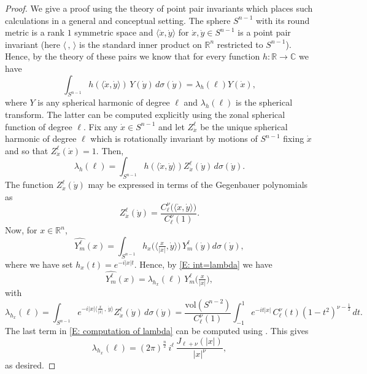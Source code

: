 \documentclass[11pt,reqno]{amsart}
\newcommand{\R}{{\mathbb R}}
\newcommand{\C}{{\mathbb C}}
\theoremstyle{definition}
\begin{document}
\begin{proof}
We give a proof using the theory of point pair invariants \cite{Sel} which places such calculations in a general and conceptual setting. The sphere $S^{n-1}$ with its round metric is a rank $1$ symmetric space and $\langle \dot x, \dot y \rangle$ for $\dot x, \dot y \in S^{n-1}$ is a point pair invariant (here $\langle \, , \, \rangle$ is the standard inner product on $\R^n$ restricted to $S^{n-1}$). Hence, by the theory of these pairs we know that for every function $h:\R \to \C$ we have
\begin{equation}\label{E: int=lambda}
\int_{S^{n-1}} h(\langle \dot x ,\dot y \rangle ) \,Y (\dot y) \,d\sigma(\dot y)= \lambda_h (\ell) Y (\dot x), 
\end{equation}
where $Y$ is any spherical harmonic of degree $\ell$ and $\lambda_h(\ell)$ is the spherical transform. The latter can be computed explicitly using the zonal spherical function of degree $\ell$.
Fix any $\dot x \in S^{n-1}$  and  let $Z^\ell_{\dot x}$ be the unique spherical harmonic of degree $\ell$ which is rotationally invariant by motions of $S^{n-1}$ fixing $\dot x$ and so that $Z^\ell_{\dot x}(\dot x)=1$. Then, 
\begin{equation}\label{E: lambda}
\lambda_h(\ell)=\int_{S^{n-1}} h(\langle \dot x, \dot y \rangle) Z^\ell_{\dot x}(\dot y)\, d\sigma(\dot y).
\end{equation}
The function $Z^\ell_{\dot x}(\dot y)$ may be expressed in terms of the Gegenbauer polynomials  \cite[(8.930)]{GR} as
\begin{equation}\label{E: zonal, gegenb}
 Z^\ell_{\dot x}(\dot y)=\frac{C_\ell^\nu \big(\big \langle \dot x, \dot y \big \rangle \big) }{C_\ell^{\nu}(1) }.
\end{equation}
Now, for $x \in \R^n$,
\[ \widehat{Y^\ell_m}(x)=\int_{S^{n-1}} h_x\big( \big \langle \tfrac{x}{|x|}, \dot y  \big \rangle \big)\, Y^\ell_m(\dot y) d\sigma(\dot y),\]
where we have set $h_x(t)=e^{-i|x| t}$. Hence, by \eqref{E: int=lambda} we have
\[ \widehat{Y^\ell_m}(x)= \lambda_{h_x} (\ell) \, Y^\ell_m\big( \tfrac{x}{|x|} \big),\]
with 
\begin{equation}\label{E: computation of lambda}
\lambda_{h_x}(\ell)
= \int_{S^{n-1}} e^{-i |x| \big \langle  \tfrac{x}{|x|}\, ,\, \dot y \big \rangle }Z^\ell_{\dot x}(\dot y)\, d\sigma(\dot y)
= \frac{\text{vol}(S^{n-2})}{C_\ell^\nu(1) } \int_{-1}^1 e^{-it|x|} \, C^\nu_\ell(t) (1-t^2)^{\nu -\frac{1}{2}} \, dt.
\end{equation}
The last term in \eqref{E: computation of lambda} can be computed using   \cite[(7.321)]{GR}. This gives
\[\lambda_{h_x}(\ell)=(2\pi)^{\frac{n}{2}}\, i^\ell\, \frac{J_{\ell+\nu}(|x|)}{|x|^\nu},\]
as desired.


\end{proof}
\end{document}
